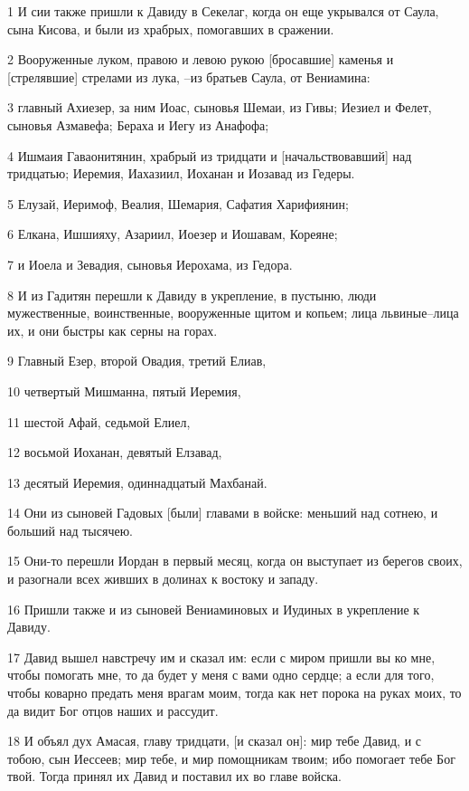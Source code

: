\par 1 И сии также пришли к Давиду в Секелаг, когда он еще укрывался от Саула, сына Кисова, и были из храбрых, помогавших в сражении.
\par 2 Вооруженные луком, правою и левою рукою [бросавшие] каменья и [стрелявшие] стрелами из лука, --из братьев Саула, от Вениамина:
\par 3 главный Ахиезер, за ним Иоас, сыновья Шемаи, из Гивы; Иезиел и Фелет, сыновья Азмавефа; Бераха и Иегу из Анафофа;
\par 4 Ишмаия Гаваонитянин, храбрый из тридцати и [начальствовавший] над тридцатью; Иеремия, Иахазиил, Иоханан и Иозавад из Гедеры.
\par 5 Елузай, Иеримоф, Веалия, Шемария, Сафатия Харифиянин;
\par 6 Елкана, Ишшияху, Азариил, Иоезер и Иошавам, Кореяне;
\par 7 и Иоела и Зевадия, сыновья Иерохама, из Гедора.
\par 8 И из Гадитян перешли к Давиду в укрепление, в пустыню, люди мужественные, воинственные, вооруженные щитом и копьем; лица львиные--лица их, и они быстры как серны на горах.
\par 9 Главный Езер, второй Овадия, третий Елиав,
\par 10 четвертый Мишманна, пятый Иеремия,
\par 11 шестой Афай, седьмой Елиел,
\par 12 восьмой Иоханан, девятый Елзавад,
\par 13 десятый Иеремия, одиннадцатый Махбанай.
\par 14 Они из сыновей Гадовых [были] главами в войске: меньший над сотнею, и больший над тысячею.
\par 15 Они-то перешли Иордан в первый месяц, когда он выступает из берегов своих, и разогнали всех живших в долинах к востоку и западу.
\par 16 Пришли также и из сыновей Вениаминовых и Иудиных в укрепление к Давиду.
\par 17 Давид вышел навстречу им и сказал им: если с миром пришли вы ко мне, чтобы помогать мне, то да будет у меня с вами одно сердце; а если для того, чтобы коварно предать меня врагам моим, тогда как нет порока на руках моих, то да видит Бог отцов наших и рассудит.
\par 18 И объял дух Амасая, главу тридцати, [и сказал он]: мир тебе Давид, и с тобою, сын Иессеев; мир тебе, и мир помощникам твоим; ибо помогает тебе Бог твой. Тогда принял их Давид и поставил их во главе войска.
